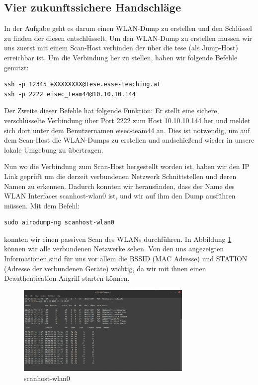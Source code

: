 \documentclass[12pt, a4paper, titlepage, oneside]{scrartcl}
\begin{document}
\subsection{Vier zukunftssichere Handschl\"age}
In der Aufgabe geht es darum einen WLAN-Dump zu erstellen und den Schlüssel zu finden der diesen entschlüsselt.
Um den WLAN-Dump zu erstellen mussen wir uns zuerst mit einem Scan-Host verbinden der über die tese (als Jump-Host) erreichbar ist. Um die Verbindung her zu stellen, haben wir folgende Befehle genutzt:

\begin{lstlisting}
ssh -p 12345 eXXXXXXXX@tese.esse-teaching.at
ssh -p 2222 eisec_team44@10.10.10.144
\end{lstlisting}

Der Zweite dieser Befehle hat folgende Funktion:
Er stellt eine sichere, verschlüsselte Verbindung über Port 2222 zum Host 10.10.10.144 her und meldet sich dort unter dem Benutzernamen eisec-team44 an. Dies ist notwendig, um auf dem Scan-Host die WLAN-Dumps zu erstellen und andschießend wieder in unsere lokale Umgebung zu übertragen.


Nun wo die Verbindung zum Scan-Host hergestellt worden ist, haben wir den IP Link geprüft um die derzeit verbundenen Netzwerk Schnittstellen und deren Namen zu erkennen. Dadurch konnten wir herausfinden, dass der Name des WLAN Interfaces scanhost-wlan0 ist, und wir auf ihm den Dump ausführen müssen. Mit dem Befehl:

\begin{lstlisting}
sudo airodump-ng scanhost-wlan0 
\end{lstlisting}

konnten wir einen passiven Scan des WLANs durchführen. In Abbildung \ref{fig:scanhost-wlan0} können wir alle verbundenen Netzwerke sehen. Von den uns angezeigten Informationen sind für uns vor allem die BSSID (MAC Adresse) und STATION (Adresse der verbundenen Geräte) wichtig, da wir mit ihnen einen Deauthentication Angriff starten können.

\begin{figure}[h]
\centering
\includegraphics[width=0.75\textwidth]{imgs/Wireless Time Travel/scanhost-wlan0.png}
\caption{scanhost-wlan0}
\label{fig:scanhost-wlan0}
\end{figure}
\end{document}
